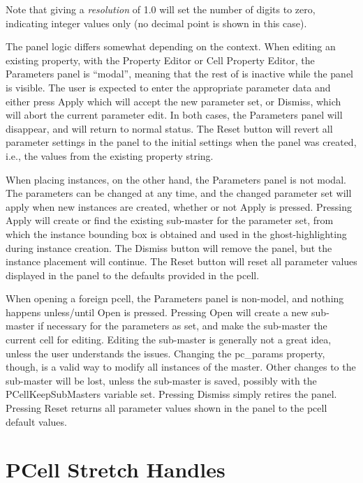 Note that giving a {\it resolution} of 1.0 will set the number of
digits to zero, indicating integer values only (no decimal point is
shown in this case).

The panel logic differs somewhat depending on the context.  When
editing an existing property, with the {\cb Property Editor} or {\cb
Cell Property Editor}, the {\cb Parameters} panel is ``modal'',
meaning that the rest of {\Xic} is inactive while the panel is
visible.  The user is expected to enter the appropriate parameter data
and either press {\cb Apply} which will accept the new parameter set,
or {\cb Dismiss}, which will abort the current parameter edit.  In
both cases, the {\cb Parameters} panel will disappear, and {\Xic} will
return to normal status.  The {\cb Reset} button will revert all
parameter settings in the panel to the initial settings when the panel
was created, i.e., the values from the existing property string.

When placing instances, on the other hand, the {\cb Parameters} panel
is not modal.  The parameters can be changed at any time, and the
changed parameter set will apply when new instances are created,
whether or not {\cb Apply} is pressed.  Pressing {\cb Apply} will
create or find the existing sub-master for the parameter set, from
which the instance bounding box is obtained and used in the
ghost-highlighting during instance creation.  The {\cb Dismiss} button
will remove the panel, but the instance placement will continue.  The
{\cb Reset} button will reset all parameter values displayed in the
panel to the defaults provided in the pcell.

When opening a foreign pcell, the {\cb Parameters} panel is non-model,
and nothing happens unless/until {\cb Open} is pressed.  Pressing {\cb
Open} will create a new sub-master if necessary for the parameters as
set, and make the sub-master the current cell for editing.  Editing
the sub-master is generally not a great idea, unless the user
understands the issues.  Changing the {\et pc\_params} property,
though, is a valid way to modify all instances of the master.  Other
changes to the sub-master will be lost, unless the sub-master is
saved, possibly with the {\et PCellKeepSubMasters} variable set. 
Pressing {\cb Dismiss} simply retires the panel.  Pressing {\cb Reset}
returns all parameter values shown in the panel to the pcell default
values.


\section{PCell Stretch Handles}
\label{pcstretch}

